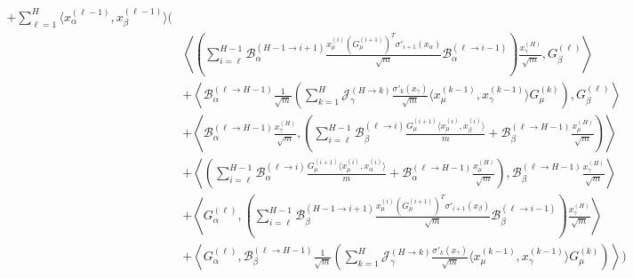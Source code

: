 \documentclass[11pt,a4paper]{article}
\theoremstyle{definition}
\begin{document}
\begin{align}
    + \sum_{\ell=1}^{H} \langle x^{(\ell-1)}_\alpha, x^{(\ell-1)}_\beta \rangle \Biggl( & \nonumber \\
    & \left\langle \left( \sum_{i=\ell}^{H-1} \mathcal{B}^{(H-1 \to i+1)}_\alpha \frac{x^{(i)}_\mu (G^{(i+1)}_\mu)^T \sigma'_{i+1}(x_\alpha)}{\sqrt{m}} \mathcal{B}^{(\ell \to i-1)}_\alpha \right) \frac{x^{(H)}_\gamma}{\sqrt{m}}, G^{(\ell)}_\beta \right\rangle \nonumber \\
    & + \left\langle \mathcal{B}^{(\ell \to H-1)}_{\alpha} \frac{1}{\sqrt{m}}\left( \sum_{k=1}^{H} \mathcal{J}^{(H \to k)}_{\gamma} \frac{\sigma'_{k}(x_\gamma)}{\sqrt{m}} \langle x^{(k-1)}_\mu, x^{(k-1)}_\gamma \rangle G^{(k)}_\mu \right), G^{(\ell)}_\beta \right\rangle \nonumber \\
    & + \left\langle \mathcal{B}^{(\ell \to H-1)}_{\alpha} \frac{x^{(H)}_\gamma}{\sqrt{m}}, \left( \sum_{i=\ell}^{H-1} \mathcal{B}^{(\ell \to i)}_{\beta} \frac{G^{(i+1)}_\mu \langle x^{(i)}_\mu, x^{(i)}_\beta \rangle}{m} + \mathcal{B}^{(\ell \to H-1)}_{\beta} \frac{x^{(H)}_\mu}{\sqrt{m}} \right) \right\rangle \nonumber \\
    & + \left\langle \left( \sum_{i=\ell}^{H-1} \mathcal{B}^{(\ell \to i)}_{\alpha} \frac{G^{(i+1)}_\mu \langle x^{(i)}_\mu, x^{(i)}_\alpha \rangle}{m} + \mathcal{B}^{(\ell \to H-1)}_{\alpha} \frac{x^{(H)}_\mu}{\sqrt{m}} \right), \mathcal{B}^{(\ell \to H-1)}_{\beta} \frac{x^{(H)}_\gamma}{\sqrt{m}} \right\rangle \nonumber \\
    & + \left\langle G^{(\ell)}_\alpha, \left( \sum_{i=\ell}^{H-1} \mathcal{B}^{(H-1 \to i+1)}_\beta \frac{x^{(i)}_\mu (G^{(i+1)}_\mu)^T \sigma'_{i+1}(x_\beta)}{\sqrt{m}} \mathcal{B}^{(\ell \to i-1)}_\beta \right) \frac{x^{(H)}_\gamma}{\sqrt{m}} \right\rangle \nonumber \\
    & + \left\langle G^{(\ell)}_\alpha, \mathcal{B}^{(\ell \to H-1)}_{\beta} \frac{1}{\sqrt{m}}\left( \sum_{k=1}^{H} \mathcal{J}^{(H \to k)}_{\gamma} \frac{\sigma'_{k}(x_\gamma)}{\sqrt{m}} \langle x^{(k-1)}_\mu, x^{(k-1)}_\gamma \rangle G^{(k)}_\mu \right) \right\rangle \Biggr)
    \end{align}
    
\end{document}
